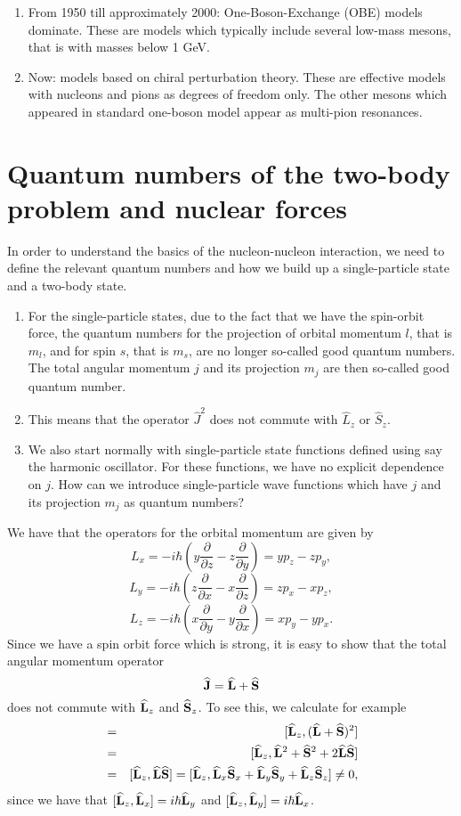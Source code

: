 \begin{enumerate}
\begin{enumerate}
\item From 1950 till approximately 2000: One-Boson-Exchange (OBE) models dominate. These are models which typically include several low-mass mesons, that is with masses below 1 GeV.
\item Now: models based on chiral perturbation theory. These are effective models with nucleons and pions as degrees of freedom only. The other mesons which appeared in standard one-boson model appear as multi-pion resonances. 
\end{enumerate}




\section{Quantum numbers of the two-body problem and nuclear forces}




In order to understand the basics of the nucleon-nucleon interaction, we need to define the relevant quantum numbers and how we build up a single-particle state and a two-body state. 
\begin{enumerate}
\item For the single-particle states, due to the fact that we have the spin-orbit force, the quantum numbers for the projection of orbital momentum $l$, that is $m_l$, and for spin $s$, that is $m_s$, are no longer so-called good quantum numbers. The total angular momentum $j$ and its projection $m_j$ are then 
so-called good quantum number.
\item This means that the operator $\hat{J}^2$ does not commute with $\hat{L}_z$  or $\hat{S}_z$.  
\item We also start normally with single-particle state functions defined using say the harmonic oscillator. For these functions, we have no explicit dependence on $j$. How can we introduce single-particle wave functions which have $j$ and its projection $m_j$ as quantum numbers? 
\end{enumerate}

We have that the operators for the orbital momentum are given by
\[
L_x=-i\hbar(y\frac{\partial }{\partial z}-z\frac{\partial }{\partial y})=
yp_z-zp_y,
\]
\[
L_y=-i\hbar(z\frac{\partial }{\partial x}-x\frac{\partial }{\partial z})= zp_x-xp_z,
\]
\[
L_z=-i\hbar(x\frac{\partial }{\partial y}-y\frac{\partial }{\partial x})=xp_y-yp_x.
\]
Since we have a spin orbit force which is strong, it is easy to show that 
the total angular momentum operator
\[
   {\bf\widehat{J}}={\bf\widehat{L}}+{\bf\widehat{S}}
\]
does not commute with ${\bf\widehat{L}}_z$ and ${\bf\widehat{S}}_z$. To see this, we calculate for example
\begin{eqnarray} 
   [\OP{L}_z,\OP{J}^2]&=&[\OP{L}_z,(\OP{L}+\OP{S})^2] \\ \nonumber
   &=&[\OP{L}_z,\OP{L}^2+\OP{S}^2+2\OP{L}\OP{S}]\\ \nonumber 
   &=& [\OP{L}_z,\OP{L}\OP{S}]=[\OP{L}_z,\OP{L}_x\OP{S}_x+\OP{L}_y\OP{S}_y+\OP{L}_z\OP{S}_z]\ne 0, 
\end{eqnarray}
since we have that $[{\bf\widehat{L}}_z,{\bf\widehat{L}}_x]=i\hbar{\bf\widehat{L}}_y$ and $[{\bf\widehat{L}}_z,{\bf\widehat{L}}_y]=i\hbar{\bf\widehat{L}}_x$. 


\end{enumerate}
